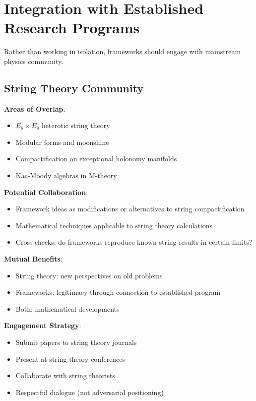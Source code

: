 \section{Integration with Established Research Programs}

Rather than working in isolation, frameworks should engage with mainstream physics community.

\subsection{String Theory Community}

\textbf{Areas of Overlap}:
\begin{itemize}
    \item $E_8 \times E_8$ heterotic string theory
    \item Modular forms and moonshine
    \item Compactification on exceptional holonomy manifolds
    \item Kac-Moody algebras in M-theory
\end{itemize}

\textbf{Potential Collaboration}:
\begin{itemize}
    \item Framework ideas as modifications or alternatives to string compactification
    \item Mathematical techniques applicable to string theory calculations
    \item Cross-checks: do frameworks reproduce known string results in certain limits?
\end{itemize}

\textbf{Mutual Benefits}:
\begin{itemize}
    \item String theory: new perspectives on old problems
    \item Frameworks: legitimacy through connection to established program
    \item Both: mathematical developments
\end{itemize}

\textbf{Engagement Strategy}:
\begin{itemize}
    \item Submit papers to string theory journals
    \item Present at string theory conferences
    \item Collaborate with string theorists
    \item Respectful dialogue (not adversarial positioning)
\end{itemize}

